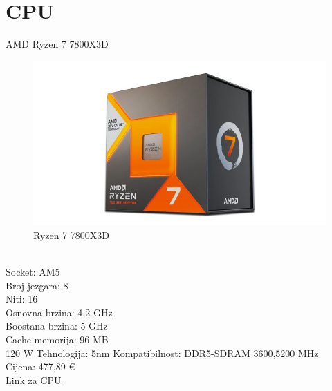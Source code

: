 \documentclass{article}
\begin{document}
\section{CPU}
AMD Ryzen 7 7800X3D
\begin{figure}[h]
    \includegraphics[width=12cm]{ryzen7800x3d.jpg}
    \caption{Ryzen 7 7800X3D}
\end{figure}\\
Socket: AM5\\
Broj jezgara: 8 \\
Niti: 16\\
Osnovna brzina: 4.2 GHz\\
Boostana brzina: 5 GHz\\
Cache memorija: 96 MB\\
120 W
Tehnologija: 5nm
Kompatibilnost: DDR5-SDRAM 3600,5200 MHz\\
Cijena: 477,89 €\\
\href{https://www.adm.hr/cpu-amd-ryzen-7-7800x3d-box-bez-coolera-420-500ghz-am5-100-100000910wof/77242/product/?utm_source=nabava.net&utm_campaign=nabava.net&utm_medium=click}{Link za CPU}
\newpage
\end{document}
